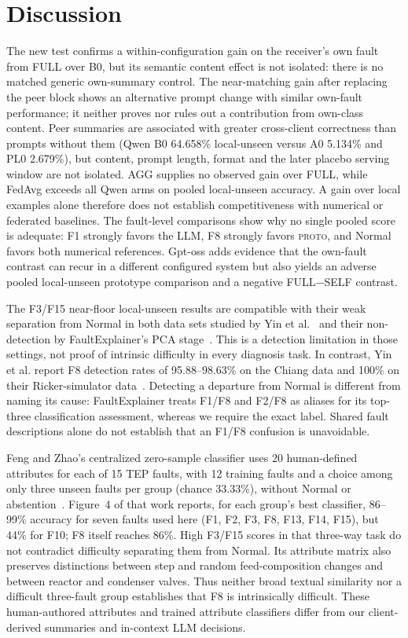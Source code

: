 \documentclass[conference]{IEEEtran}
\newcommand{\PROTO}{\textsc{proto}}
\newcommand{\cond}[1]{\textsf{#1}}
\begin{document}
\section{Discussion}
\label{sec:discussion}
The new test confirms a within-configuration gain on the receiver's own fault from \cond{FULL} over \cond{B0}, but its semantic content effect is not isolated: there is no matched generic own-summary control. The near-matching gain after replacing the peer block shows an alternative prompt change with similar own-fault performance; it neither proves nor rules out a contribution from own-class content. Peer summaries are associated with greater cross-client correctness than prompts without them (Qwen \cond{B0} 64.658\% local-unseen versus \cond{A0} 5.134\% and \cond{PL0} 2.679\%), but content, prompt length, format and the later placebo serving window are not isolated. \cond{AGG} supplies no observed gain over \cond{FULL}, while FedAvg exceeds all Qwen arms on pooled local-unseen accuracy. A gain over local examples alone therefore does not establish competitiveness with numerical or federated baselines. The fault-level comparisons show why no single pooled score is adequate: F1 strongly favors the LLM, F8 strongly favors \PROTO{}, and Normal favors both numerical references. Gpt-oss adds evidence that the own-fault contrast can recur in a different configured system but also yields an adverse pooled local-unseen prototype comparison and a negative \cond{FULL}$-$\cond{SELF} contrast.

The F3/F15 near-floor local-unseen results are compatible with their weak separation from Normal in both data sets studied by Yin et al.~\cite{yin2012comparison} and their non-detection by FaultExplainer's PCA stage~\cite{khan2025faultexplainer}. This is a detection limitation in those settings, not proof of intrinsic difficulty in every diagnosis task. In contrast, Yin et al. report F8 detection rates of 95.88--98.63\% on the Chiang data and 100\% on their Ricker-simulator data~\cite{yin2012comparison}. Detecting a departure from Normal is different from naming its cause: FaultExplainer treats F1/F8 and F2/F8 as aliases for its top-three classification assessment, whereas we require the exact label. Shared fault descriptions alone do not establish that an F1/F8 confusion is unavoidable.

Feng and Zhao's centralized zero-sample classifier uses 20 human-defined attributes for each of 15 TEP faults, with 12 training faults and a choice among only three unseen faults per group (chance 33.33\%), without Normal or abstention~\cite{feng2021attributes}. Figure~4 of that work reports, for each group's best classifier, 86--99\% accuracy for seven faults used here (F1, F2, F3, F8, F13, F14, F15), but 44\% for F10; F8 itself reaches 86\%. High F3/F15 scores in that three-way task do not contradict difficulty separating them from Normal. Its attribute matrix also preserves distinctions between step and random feed-composition changes and between reactor and condenser valves. Thus neither broad textual similarity nor a difficult three-fault group establishes that F8 is intrinsically difficult. These human-authored attributes and trained attribute classifiers differ from our client-derived summaries and in-context LLM decisions.
\end{document}
